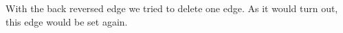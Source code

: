 			With the back reversed edge we tried to delete one edge. As it would turn out, this edge would be set again.
			 \label{img.delete}
			







		
